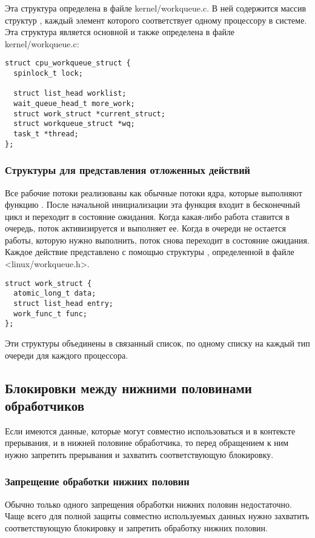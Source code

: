 Эта структура определена в файле kernel/workqueue.c. В ней содержится массив структур , каждый элемент которого соответствует одному процессору в системе. Эта структура является основной и также определена в файле kernel/workqueue.c:

\begin{lstlisting}
struct cpu_workqueue_struct {
  spinlock_t lock;

  struct list_head worklist;
  wait_queue_head_t more_work;
  struct work_struct *current_struct;
  struct workqueue_struct *wq;
  task_t *thread;
};
\end{lstlisting}

\subsubsection{Структуры для представления отложенных действий}

Все рабочие потоки реализованы как обычные потоки ядра, которые выполняют функцию . После начальной инициализации эта функция входит в бесконечный цикл и переходит в состояние ожидания. Когда какая-либо работа ставится в очередь, поток активизируется и выполняет ее. Когда в очереди не остается работы, которую нужно выполнить, поток снова переходит в состояние ожидания. Каждое действие представлено с помощью структуры , определенной в файле <linux/workqueue.h>.
\begin{lstlisting}
struct work_struct {
  atomic_long_t data;
  struct list_head entry;
  work_func_t func;
};
\end{lstlisting}

Эти структуры объединены в связанный список, по одному списку на каждый тип очереди для каждого процессора.

\subsection{Блокировки между нижними половинами обработчиков}
Если имеются данные, которые могут совместно использоваться и в контексте прерывания, и в нижней половине обработчика, то перед обращением к ним нужно запретить прерывания и захватить соответствующую блокировку.


\subsubsection{Запрещение обработки нижних половин}
Обычно только одного запрещения обработки нижних половин недостаточно. Чаще всего для полной защиты совместно используемых данных нужно захватить соответствующую блокировку и запретить обработку нижних половин.

